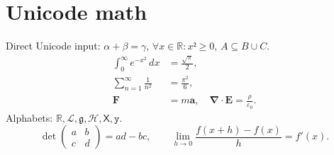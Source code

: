 \documentclass{article}
\begin{document}
\section{Unicode math}
Direct Unicode input: $α + β = γ$, $∀x ∈ ℝ: x² ≥ 0$, $A ⊆ B ∪ C$.
\begin{align}
  \int_0^\infty e^{-x^2}\,dx &= \frac{\sqrt{\pi}}{2}, \\
  \sum_{n=1}^{\infty} \frac{1}{n^2} &= \frac{\pi^2}{6}, \\
  \mathbf{F} &= m\mathbf{a}, \quad \symbf{\nabla}\cdot\symbf{E} = \frac{\rho}{\varepsilon_0}.
\end{align}
Alphabets: $\mathbb{R}, \mathcal{L}, \mathfrak{g}, \mathscr{H}, \mathsf{X}, \mathtt{y}$.
\[ \det\begin{pmatrix} a & b\\ c & d\end{pmatrix} = ad - bc, \qquad
   \lim_{h\to0}\frac{f(x+h)-f(x)}{h} = f'(x). \]
\end{document}

